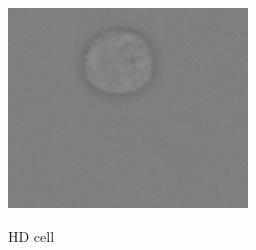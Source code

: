 \begin{figure}[ht]
	\begin{center}
		\begin{subfigure}[b]{0.25\textwidth}
			\includegraphics[width=\textwidth]{thesis-template-master/images/hd7 (80).png}
			\label{fig:Debris}
			\caption{HD cell}
		\end{subfigure}
		\begin{subfigure}[b]{0.25\textwidth}

\end{subfigure}
\end{center}
\end{figure}
